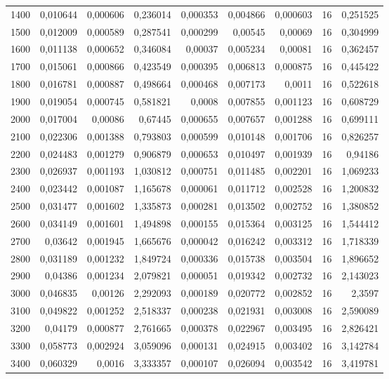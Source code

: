\begin{tabular}{r r r r r r r r r}
1400 & 0,010644 & 0,000606 & 0,236014 & 0,000353 & 0,004866 & 0,000603 & 16 & 0,251525 \\
1500 & 0,012009 & 0,000589 & 0,287541 & 0,000299 & 0,00545 & 0,00069 & 16 & 0,304999 \\
1600 & 0,011138 & 0,000652 & 0,346084 & 0,00037 & 0,005234 & 0,00081 & 16 & 0,362457 \\
1700 & 0,015061 & 0,000866 & 0,423549 & 0,000395 & 0,006813 & 0,000875 & 16 & 0,445422 \\
1800 & 0,016781 & 0,000887 & 0,498664 & 0,000468 & 0,007173 & 0,0011 & 16 & 0,522618 \\
1900 & 0,019054 & 0,000745 & 0,581821 & 0,0008 & 0,007855 & 0,001123 & 16 & 0,608729 \\
2000 & 0,017004 & 0,00086 & 0,67445 & 0,000655 & 0,007657 & 0,001288 & 16 & 0,699111 \\
2100 & 0,022306 & 0,001388 & 0,793803 & 0,000599 & 0,010148 & 0,001706 & 16 & 0,826257 \\
2200 & 0,024483 & 0,001279 & 0,906879 & 0,000653 & 0,010497 & 0,001939 & 16 & 0,94186 \\
2300 & 0,026937 & 0,001193 & 1,030812 & 0,000751 & 0,011485 & 0,002201 & 16 & 1,069233 \\
2400 & 0,023442 & 0,001087 & 1,165678 & 0,000061 & 0,011712 & 0,002528 & 16 & 1,200832 \\
2500 & 0,031477 & 0,001602 & 1,335873 & 0,000281 & 0,013502 & 0,002752 & 16 & 1,380852 \\
2600 & 0,034149 & 0,001601 & 1,494898 & 0,000155 & 0,015364 & 0,003125 & 16 & 1,544412 \\
2700 & 0,03642 & 0,001945 & 1,665676 & 0,000042 & 0,016242 & 0,003312 & 16 & 1,718339 \\
2800 & 0,031189 & 0,001232 & 1,849724 & 0,000336 & 0,015738 & 0,003504 & 16 & 1,896652 \\
2900 & 0,04386 & 0,001234 & 2,079821 & 0,000051 & 0,019342 & 0,002732 & 16 & 2,143023 \\
3000 & 0,046835 & 0,00126 & 2,292093 & 0,000189 & 0,020772 & 0,002852 & 16 & 2,3597 \\
3100 & 0,049822 & 0,001252 & 2,518337 & 0,000238 & 0,021931 & 0,003008 & 16 & 2,590089 \\
3200 & 0,04179 & 0,000877 & 2,761665 & 0,000378 & 0,022967 & 0,003495 & 16 & 2,826421 \\
3300 & 0,058773 & 0,002924 & 3,059096 & 0,000131 & 0,024915 & 0,003402 & 16 & 3,142784 \\
3400 & 0,060329 & 0,0016 & 3,333357 & 0,000107 & 0,026094 & 0,003542 & 16 & 3,419781 \\

\end{tabular}
